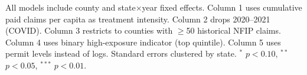 \begin{table}[htbp]
   \par \raggedright 
   All models include county and state$\times$year fixed effects. Column 1 uses cumulative paid claims per capita as treatment intensity. Column 2 drops 2020--2021 (COVID). Column 3 restricts to counties with $\geq$50 historical NFIP claims. Column 4 uses binary high-exposure indicator (top quintile). Column 5 uses permit levels instead of logs. Standard errors clustered by state. $^{*}$ $p<0.10$, $^{**}$ $p<0.05$, $^{***}$ $p<0.01$.
\end{table}


